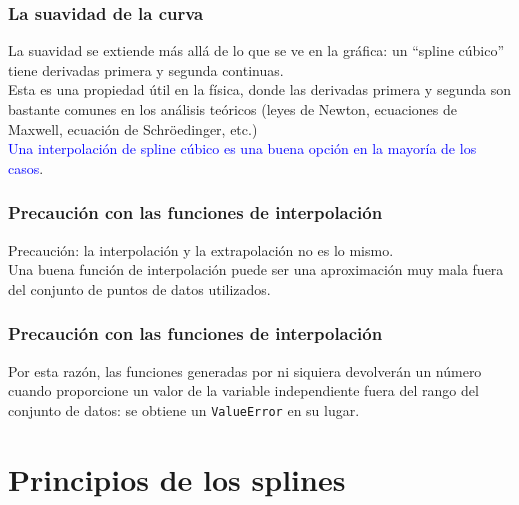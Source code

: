 {\begin{frame}
\begin{figure}
\end{figure}
\end{frame}
\begin{frame}
\frametitle{La suavidad de la curva}
La suavidad se extiende más allá de lo que se ve en la gráfica: un \enquote{spline cúbico} tiene derivadas primera y segunda continuas.
\\
\bigskip
Esta es una propiedad útil en la física, donde las derivadas primera y segunda son bastante comunes en los análisis teóricos (leyes de Newton, ecuaciones de Maxwell, ecuación de Schröedinger, etc.)
\\
\medskip
\pause
\textcolor{blue}{Una interpolación de spline cúbico es una buena opción en la mayoría de los casos}.
\end{frame}
\begin{frame}
\frametitle{Precaución con las funciones de interpolación}
Precaución: la interpolación y la extrapolación no es lo mismo.
\\
\bigskip
Una buena función de interpolación puede ser una aproximación muy mala fuera del conjunto de puntos de datos utilizados. 
\end{frame}
\begin{frame}
\frametitle{Precaución con las funciones de interpolación}
Por esta razón, las funciones generadas por  ni siquiera devolverán un número cuando proporcione un valor de la variable independiente fuera del rango del conjunto de datos: se obtiene un \texttt{ValueError} en su lugar.
\end{frame}
\section{Principios de los splines}
}
